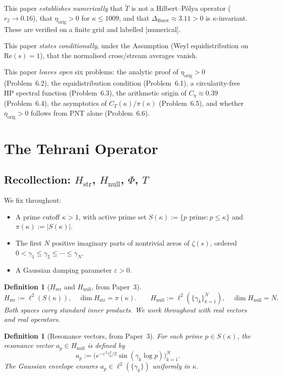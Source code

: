 \documentclass[11pt]{article}
\newtheorem{definition}[theorem]{Definition}
\newcommand{\Hstr}{H_{\mathrm{str}}}
\newcommand{\Hnull}{H_{\mathrm{null}}}
\newcommand{\etaorig}{\eta_{\mathrm{orig}}}
\newcommand{\Tt}{\widetilde{T}}
\newcommand{\Ceta}{C_{\eta}}
\newcommand{\CT}{C_{T}}
\newcommand{\Dburstvar}{\Delta_{\mathrm{Burst}}}
\begin{document}
This paper \emph{establishes numerically} that $\Tt$ is not a
Hilbert--P\'olya operator ($r_2\to 0.16$), that $\etaorig > 0$ for
$\kappa\le 1009$, and that $\Dburstvar\approx 3.11>0$ is
$\kappa$-invariant. These are verified on a finite grid and labelled
[numerical].

This paper \emph{states conditionally}, under the Assumption (Weyl
equidistribution on $\mathrm{Re}(s)=1$), that the normalised
cross/stream averages vanish.

This paper \emph{leaves open} six problems: the analytic proof of
$\etaorig > 0$ (Problem~6.2), the equidistribution condition
(Problem~6.1), a circularity-free HP spectral function (Problem~6.3),
the arithmetic origin of $\Ceta\approx 0.39$ (Problem~6.4), the
asymptotics of $\CT(\kappa)/\pi(\kappa)$ (Problem~6.5), and whether
$\etaorig > 0$ follows from PNT alone (Problem~6.6).

\section{The Tehrani Operator}

\subsection{Recollection: $\Hstr$, $\Hnull$, $\Phi$, $T$}

We fix throughout:
\begin{itemize}
\item A prime cutoff $\kappa > 1$, with active prime set
  $S(\kappa) := \{p\text{ prime}: p\leq\kappa\}$
  and $\pi(\kappa) := |S(\kappa)|$.
\item The first $N$ positive imaginary parts of nontrivial zeros of
  $\zeta(s)$, ordered $0 < \gamma_1 \leq \gamma_2 \leq \cdots \leq \gamma_N$.
\item A Gaussian damping parameter $\varepsilon > 0$.
\end{itemize}

\begin{definition}[$\Hstr$ and $\Hnull$, from Paper~3]
\[
\Hstr := \ell^2(S(\kappa)),\quad \dim\Hstr = \pi(\kappa).
\qquad
\Hnull := \ell^2(\{\gamma_k\}_{k=1}^N),\quad \dim\Hnull = N.
\]
Both spaces carry standard inner products.
We work throughout with real vectors and real operators.
\end{definition}

\begin{definition}[Resonance vectors, from Paper~3]
For each prime $p\in S(\kappa)$, the \emph{resonance vector}
$a_p\in\Hnull$ is defined by
\[
a_p := \bigl(e^{-\varepsilon^2\gamma_k^2/2}\sin(\gamma_k\log p)\bigr)_{k=1}^N.
\]
The Gaussian envelope ensures $a_p\in\ell^2(\{\gamma_k\})$ uniformly
in $\kappa$.
\end{definition}
\end{document}
